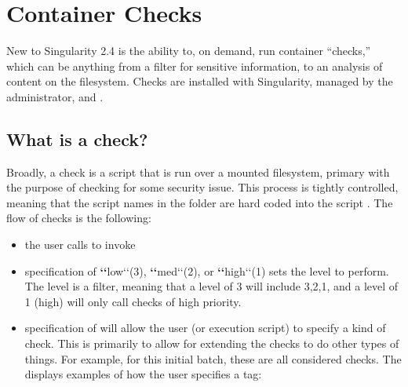 \documentclass[letterpaper,10pt,english]{sphinxmanual}
\begin{document}
\chapter{Container Checks}
\label{\detokenize{container_checks:container-checks}}\label{\detokenize{container_checks::doc}}
New to Singularity 2.4 is the ability to, on demand, run container
“checks,” which can be anything from a filter for sensitive information,
to an analysis of content on the filesystem. Checks are installed with
Singularity, managed by the administrator, and .


\section{What is a check?}
\label{\detokenize{container_checks:what-is-a-check}}
Broadly, a check is a script that is run over a mounted filesystem,
primary with the purpose of checking for some security issue. This
process is tightly controlled, meaning that the script names in the
folder are hard coded into the script
.
The flow of checks is the following:
\begin{itemize}
\item {} 
the user calls  to invoke

\item {} 
specification of {\color{red}\bfseries{}{}`{}`}\textendash{}low{}`{}`(3), {\color{red}\bfseries{}{}`{}`}\textendash{}med{}`{}`(2), or {\color{red}\bfseries{}{}`{}`}\textendash{}high{}`{}`(1) sets the level to perform. The
level is a filter, meaning that a level of 3 will include 3,2,1, and
a level of 1 (high) will only call checks of high priority.

\item {} 
specification of  will allow the user (or execution script) to specify
a kind of check. This is primarily to allow for extending the checks
to do other types of things. For example, for this initial batch,
these are all considered  checks. The
displays examples of how the user specifies a tag:

\end{itemize}
\end{document}

